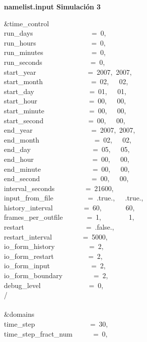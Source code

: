 
\textbf{namelist.input Simulación 3}

\&time\_control~~~~~~~~~~~~\\
run\_days~~~~~~~~~~~~~~~~~=~0,\\
run\_hours~~~~~~~~~~~~~~~~=~0,\\
run\_minutes~~~~~~~~~~~~~~=~0,\\
run\_seconds~~~~~~~~~~~~~~=~0,\\
start\_year~~~~~~~~~~~~~~~=~2007,~2007,~\\
start\_month~~~~~~~~~~~~~~=~02,~~~02,~~~\\
start\_day~~~~~~~~~~~~~~~~=~01,~~~01,~~~\\
start\_hour~~~~~~~~~~~~~~~=~00,~~~00,~~~\\
start\_minute~~~~~~~~~~~~~=~00,~~~00,~~~\\
start\_second~~~~~~~~~~~~~=~00,~~~00,~~~\\
end\_year~~~~~~~~~~~~~~~~~=~2007,~2007,~\\
end\_month~~~~~~~~~~~~~~~~=~02,~~~02,~~~\\
end\_day~~~~~~~~~~~~~~~~~~=~05,~~~05,~~~\\
end\_hour~~~~~~~~~~~~~~~~~=~00,~~~00,~~~\\
end\_minute~~~~~~~~~~~~~~~=~00,~~~00,~~~\\
end\_second~~~~~~~~~~~~~~~=~00,~~~00,~~~\\
interval\_seconds~~~~~~~~~=~21600,\\
input\_from\_file~~~~~~~~~~=~.true.,~~~.true.,~~\\
history\_interval~~~~~~~~~=~60,~~~~~~~60,~~~~~~\\
frames\_per\_outfile~~~~~~~=~1,~~~~~~~~1,~~~~~~~\\
restart~~~~~~~~~~~~~~~~~~=~.false.,\\
restart\_interval~~~~~~~~~=~5000,\\
io\_form\_history~~~~~~~~~~=~2,\\
io\_form\_restart~~~~~~~~~~=~2,\\
io\_form\_input~~~~~~~~~~~~=~2,\\
io\_form\_boundary~~~~~~~~~=~2,\\
debug\_level~~~~~~~~~~~~~~=~0,\\
/\\
\\
\&domains~~~~~~~~~~~~~~~~~\\
time\_step~~~~~~~~~~~~~~~~=~30,\\
time\_step\_fract\_num~~~~~~=~0,\\
